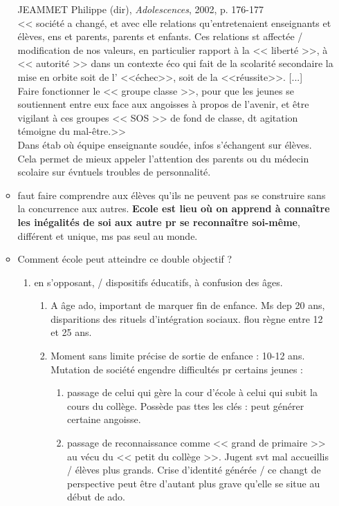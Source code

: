\documentclass[12pt]{report}
\begin{document}
\begin{itemize}
\begin{itemize}
{\begin{minipage}{19cm}
JEAMMET Philippe (dir), \textit{Adolescences}, 2002, p. 176-177 \\
 
<< société a changé, et avec elle relations qu'entretenaient enseignants et élèves, ens et parents, parents et enfants. Ces relations st affectée / modification de nos valeurs, en particulier rapport à la << liberté >>, à << autorité >> dans un contexte éco qui fait de la scolarité secondaire la mise en orbite soit de l' <<échec>>, soit de la <<réussite>>. [...] \\
Faire fonctionner le << groupe classe >>, pour que les jeunes se soutiennent entre eux face aux angoisses à propos de l'avenir, et être vigilant à ces groupes << SOS >> de fond de classe, dt agitation témoigne du mal-être.>> \\
Dans étab où équipe enseignante soudée, infos s'échangent sur élèves. Cela permet de mieux appeler l'attention des parents ou du médecin scolaire sur évntuels troubles de personnalité.\\
\end{minipage}
}

\item faut faire comprendre aux élèves qu'ils ne peuvent pas se construire sans la concurrence aux autres.\textbf{ Ecole est lieu où on apprend à connaître les inégalités de soi aux autre pr se reconnaître soi-même}, différent et unique, ms pas seul au monde. \\

\item Comment école peut atteindre ce double objectif ?
\begin{enumerate}
\item en s'opposant, / dispositifs éducatifs, à confusion des âges. \\
\begin{enumerate}
\item A âge ado, important de marquer fin de enfance. Ms dep 20 ans, disparitions des rituels d'intégration sociaux. flou règne entre 12 et 25 ans.\\
\item Moment sans limite précise de sortie de enfance : 10-12 ans. Mutation de société engendre difficultés pr certains jeunes : 
\begin{enumerate}
\item passage de celui qui gère la cour d'école à celui qui subit la cours du collège. Possède pas ttes les clés : peut générer certaine angoisse.\\
\item passage de reconnaissance comme << grand de primaire >> au vécu du << petit du collège >>. Jugent svt mal accueillis / élèves plus grands. Crise d'identité générée / ce changt de perspective peut être d'autant plus grave qu'elle se situe au début de ado.\\
\end{enumerate}


\end{enumerate}
\end{enumerate}
\end{itemize}
\end{itemize}
\end{document}

